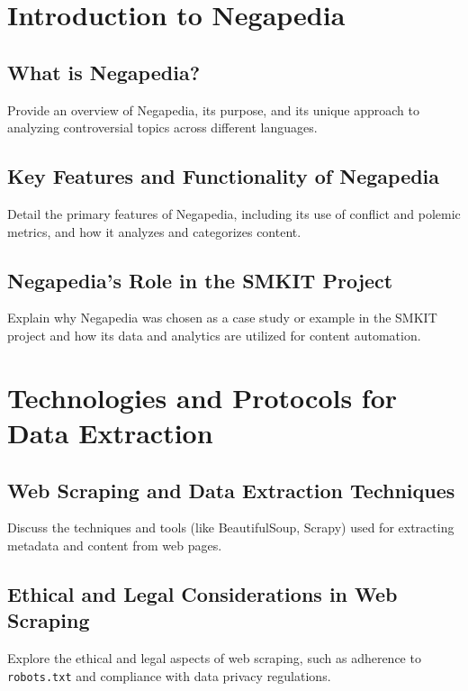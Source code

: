 \section{Introduction to Negapedia}
\label{sec:introduction_to_negapedia}

\subsection{What is Negapedia?}
\label{subsec:what_is_negapedia}
Provide an overview of Negapedia, its purpose, and its unique approach to analyzing controversial topics across different languages.

\subsection{Key Features and Functionality of Negapedia}
\label{subsec:key_features_and_functionality_of_negapedia}
Detail the primary features of Negapedia, including its use of conflict and polemic metrics, and how it analyzes and categorizes content.

\subsection{Negapedia's Role in the SMKIT Project}
\label{subsec:negapedia_s_role_in_the_smkit_project}
Explain why Negapedia was chosen as a case study or example in the SMKIT project and how its data and analytics are utilized for content automation.

\section{Technologies and Protocols for Data Extraction}
\label{sec:technologies_and_protocols_for_data_extraction}

\subsection{Web Scraping and Data Extraction Techniques}
\label{subsec:web_scraping_and_data_extraction_techniques}
Discuss the techniques and tools (like BeautifulSoup, Scrapy) used for extracting metadata and content from web pages.

\subsection{Ethical and Legal Considerations in Web Scraping}
\label{subsec:ethical_and_legal_considerations_in_web_scraping}
Explore the ethical and legal aspects of web scraping, such as adherence to \texttt{robots.txt} and compliance with data privacy regulations.

